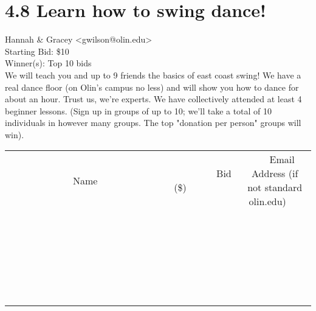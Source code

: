 \documentclass[11pt]{article}
\begin{document}
					\section*{4.8 Learn how to swing dance!}
					Hannah \& Gracey <gwilson@olin.edu> \\
					Starting Bid: \$10 \\
					Winner(s): Top 10 bids \\
					We will teach you and up to 9 friends the basics of east coast swing!  We have a real dance floor (on Olin's campus no less) and will show you how to dance for about an hour. Trust us, we're experts. We have collectively attended at least 4 beginner lessons. (Sign up in groups of up to 10; we'll take a total of 10 individuals in however many groups. The top "donation per person" groups will win). \\
					[6ex]
					\begin{tabular}{c c c}
						~~~~~~~~~~~~~Name~~~~~~~~~~~~~ & ~~~~~~~~~Bid (\$)~~~~~~~~~ & ~~~Email Address (if not standard olin.edu)~~~ \\
				
 & & \\
\hline
 & & \\
\hline
 & & \\
\hline
 & & \\
\hline
 & & \\
\hline
 & & \\
\hline
 & & \\
\hline
 & & \\
\hline
 & & \\
\hline
 & & \\
\hline
 & & \\
\hline
 & & \\
\hline
 & & \\
\hline
 & & \\
\hline
 & & \\
\hline
 & & \\
\hline
 & & \\
\hline
 & & \\
\hline
 & & \\
\hline
 & & \\
\hline
 & & \\
\hline
 & & \\
\hline
 & & \\
\hline
 & & \\
\hline
 & & \\
\hline
 & & \\
\hline
					\end{tabular}
					\clearpage
				
\end{document}
